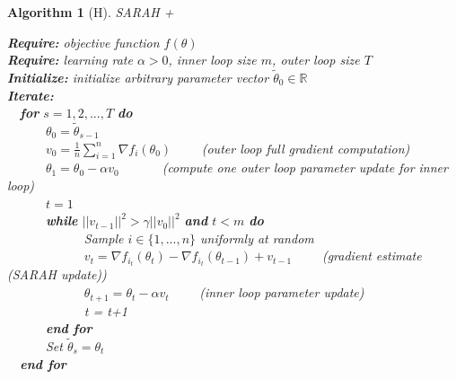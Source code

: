 \documentclass[letterpaper,11 pt]{article}
\newtheorem{algorithm}{Algorithm}
\begin{document}
\pagebreak

\begin{algorithm}[H]
\caption{SARAH +}
\label{alg:sarah}

{\bf Require:}  objective function $f(\theta)$ \\
{\bf Require:} learning rate $\alpha>0$, inner loop size $m$, outer loop size $T$ \\
{\bf Initialize:} initialize arbitrary parameter vector $\tilde{\theta}_{0} \in \mathbb{R}$ \\
{\bf Iterate:} \\
\-\ \-\ {\bf for } $s = 1,2,...,T$ {\bf do} \\
\-\ \-\ \-\ \-\ \-\ \-\  $\theta_0 = \tilde{\theta}_{s-1}$ \\
\-\ \-\ \-\ \-\ \-\ \-\   $v_0 = \frac{1}{n}\sum_{i=1}^{n}{\nabla f_{i}(\theta_0)}$ \-\ \-\ \-\ \-\  (\textit{outer loop full gradient computation}) \\
\-\ \-\ \-\ \-\ \-\ \-\   $\theta_1 = \theta_0 - \alpha v_0$
\-\ \-\ \-\ \-\ \-\ \-\  (\textit{compute one outer loop parameter update for inner loop})  \\
\-\ \-\ \-\ \-\ \-\ \-\   $t=1$ \\
\-\ \-\ \-\ \-\ \-\ \-\  {\bf while } $||v_{t-1}||^2 > \gamma ||v_0||^2$ {\bf and } $t<m$ {\bf do} \\
\-\ \-\ \-\ \-\ \-\ \-\ \-\ \-\ \-\ \-\ \-\ \-\    Sample $i \in \{1,...,n\}$ uniformly at random \\
\-\ \-\ \-\ \-\ \-\ \-\ \-\ \-\ \-\ \-\ \-\ \-\    $v_{t} =   \nabla f_{i_{t}}(\theta_{t})  - \nabla f_{i_{t}}(\theta_{t-1})  + v_{t-1}$    \-\ \-\ \-\ \-\  (\textit{gradient estimate (SARAH update)})  \\
\-\ \-\ \-\ \-\ \-\ \-\ \-\ \-\ \-\ \-\ \-\ \-\   $\theta_{t+1} = \theta_{t} - \alpha v_{t} $ \-\ \-\ \-\ \-\  (\textit{inner loop parameter update}) \\
\-\ \-\ \-\ \-\ \-\ \-\ \-\ \-\ \-\ \-\ \-\ \-\  t = t+1 \\
\-\ \-\ \-\ \-\ \-\ \-\ {\bf end for} \\
\-\ \-\ \-\ \-\ \-\ \-\  Set $\tilde{\theta}_{s} = \theta_{t}$  \\
\-\ \-\ {\bf end for }
\end{algorithm}

\pagebreak
\end{document}
